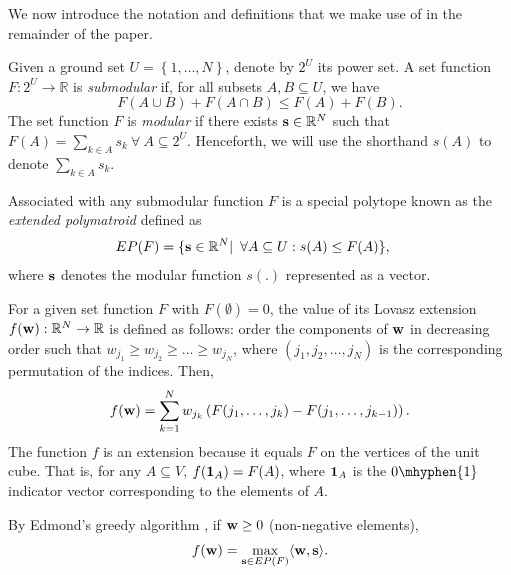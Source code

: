 \label{sec:prelim}

We now introduce the notation and definitions that we make use of in the remainder of the paper.

 Given a ground set $U = \left\{1, \dots, N \right\}$, denote by $2^U$ its power set. A set function $F: 2^U \to \mathbb{R}$ is {\it submodular} if, for all subsets $A, B \subseteq U$, we have
\begin{equation}
    F(A \cup B) + F(A \cap B) \leq F(A) + F(B).
\end{equation}
The set function $F$ is {\it modular} if there exists ${\bf s} \in \mathbb{R}^N$ such that $F(A) = \sum_{k \in A} s_k \ \forall \ A \subseteq 2^U$. Henceforth, we will use the shorthand $s(A)$ to denote ${\sum_{k \in A}} s_k$.

 Associated with any submodular function $F$ is a special polytope known as the {\it extended polymatroid} defined as
%
\begin{align}
EP(F) &= \{{\bf s} \in \mathbb{R}^N | \enskip \forall A \subseteq U: s(A) \leq F(A)\},
\label{eq:epf}
\end{align}
where $\bf s$ denotes the modular function $s(.)$ represented as a vector. 

 For a given set function $F$ with $F(\emptyset) = 0$, the value of its Lovasz extension $f({\bf w}): \mathbb{R}^N \to \mathbb{R}$ is defined as follows: order the components of $\bf w$ in decreasing order such that $w_{j_1} \geq w_{j_2} \geq \dots \geq w_{j_N}$, where $(j_1, j_2, \dots, j_N)$ is the corresponding permutation of the indices. Then,
%
\begin{align}
    f({\bf w}) = \sum_{k = 1}^{N} w_{j_k} \left(F(j_1, \dots, j_k) - F(j_1,
    \dots, j_{k - 1})\right).
    \label{eq:lovasz_def}
\end{align}
%
The function $f$ is an extension because it equals $F$ on the vertices of the
unit cube. That is, for any $A \subseteq V$, $f({\bf 1}_A) = F(A)$, where ${\bf
1}_A$ is the $0\mhyphen{1}$ indicator vector corresponding to the elements of $A$.

{\prop By Edmond's greedy algorithm \citep{edmonds1970submodular}, if ${\bf w} \geq 0$ (non-negative elements), 
\begin{equation}
    f({\bf w}) = \max_{{\bf s} \in EP(F)} \langle {\bf w}, {\bf s} \rangle.
    \label{eq:lovasz_max}
\end{equation}
\label{prop:greedy}}


